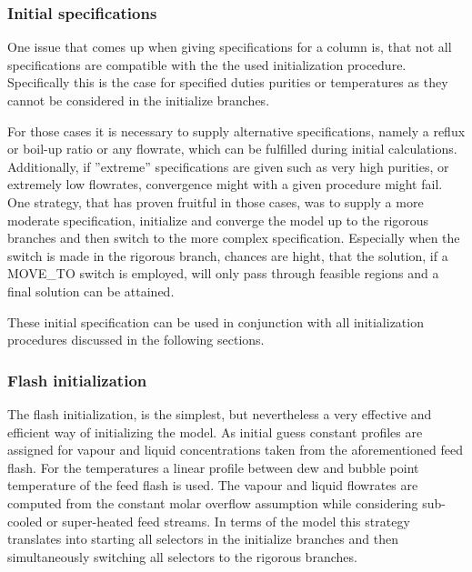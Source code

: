     \subsubsection{Initial specifications}
        One issue that comes up when giving specifications for a column is, that not all specifications 
        are compatible with the the used initialization procedure. Specifically this is the case for 
        specified duties purities or temperatures as they cannot be considered in the initialize branches. 
        
        For those cases it is necessary to supply alternative specifications, namely a reflux or boil-up ratio
        or any flowrate, which can be fulfilled during initial calculations. Additionally, if ''extreme''
        specifications are given such as very high purities, or extremely low flowrates, convergence might
        with a given procedure might fail. One strategy, that has proven fruitful in those cases, was to 
        supply a more moderate specification, initialize and converge the model up to the rigorous 
        branches and then switch to the more complex specification. Especially when the switch is made in the 
        rigorous branch, chances are hight, that the solution, if a MOVE\_TO switch is employed, will only 
        pass through feasible regions and a final solution can be attained. 
        
        These initial specification can be used in conjunction with all initialization procedures discussed
        in the following sections. 
    
    \subsubsection{Flash initialization}        
        The flash initialization, is the simplest, but nevertheless a very effective and efficient way
        of initializing the model. As initial guess constant profiles are assigned for vapour and liquid 
        concentrations taken from the aforementioned feed flash. For the temperatures a linear profile 
        between dew and bubble point temperature of the feed flash is used. The vapour and liquid 
        flowrates are computed from the constant molar overflow assumption while considering 
        sub-cooled or super-heated feed streams. In terms of the model this strategy translates into 
        starting all selectors in the initialize branches and then simultaneously switching all selectors 
        to the rigorous branches. 
        
